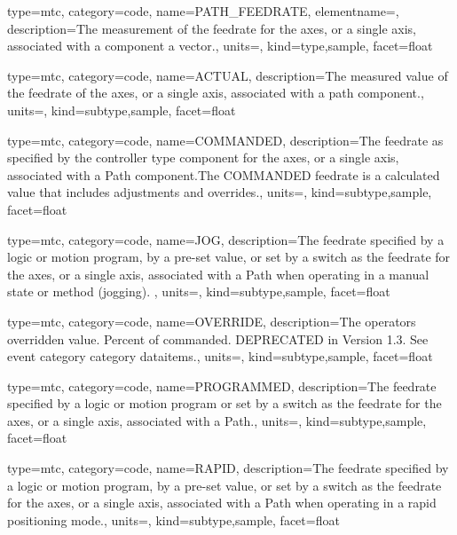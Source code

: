 {
  type=mtc,
  category=code,
  name={PATH\_FEEDRATE},
  elementname=,
  description={The measurement of the feedrate for the axes, or a single axis, associated with a  component a vector.},
  units=,
  kind={type,sample},
  facet={\gls{float}}
}


{
  type=mtc,
  category=code,
  name={ACTUAL},
  description={The measured value of the feedrate of the axes, or a single axis, associated with a path component.},
  units=,
  kind={subtype,sample},
  facet={\gls{float}}
}


{
  type=mtc,
  category=code,
  name={COMMANDED},
  description={The feedrate as specified by the \gls{controller} type component for the axes, or a single axis, associated with a Path component.The COMMANDED feedrate is a calculated value that includes adjustments and overrides.},
  units=,
  kind={subtype,sample},
  facet={\gls{float}}
}


{
  type=mtc,
  category=code,
  name={JOG},
  description={The feedrate specified by a logic or motion program, by a pre-set value, or set by a switch as the feedrate for the axes, or a single axis, associated with a Path when operating in a manual state or method (jogging).  },
  units=,
  kind={subtype,sample},
  facet={\gls{float}}
}


{
  type=mtc,
  category=code,
  name={OVERRIDE},
  description={The operators overridden value.  Percent of commanded. DEPRECATED in Version 1.3.   See \gls{event category} category \glspl{dataitem}.},
  units=,
  kind={subtype,sample},
  facet={\gls{float}}
}


{
  type=mtc,
  category=code,
  name={PROGRAMMED},
  description={The feedrate specified by a logic or motion program or set by a switch as the feedrate for the axes, or a single axis, associated with a Path.},
  units=,
  kind={subtype,sample},
  facet={\gls{float}}
}


{
  type=mtc,
  category=code,
  name={RAPID},
  description={The feedrate specified by a logic or motion program, by a pre-set value, or set by a switch as the feedrate for the axes, or a single axis, associated with a Path when operating in a rapid positioning mode.},
  units=,
  kind={subtype,sample},
  facet={\gls{float}}
}


